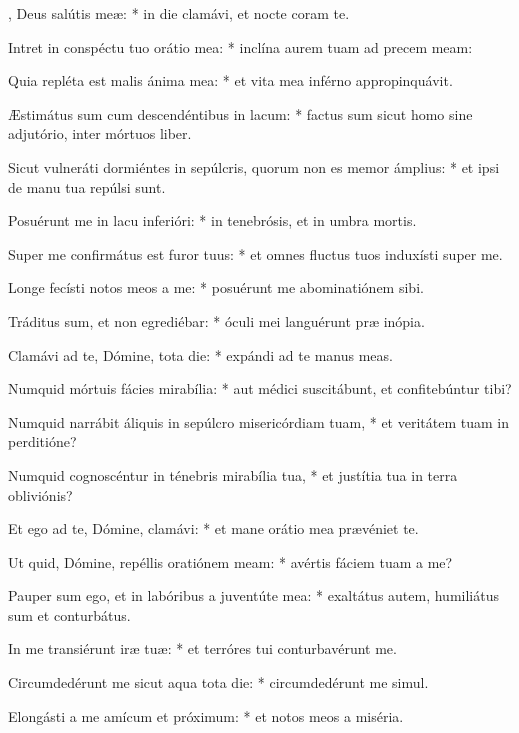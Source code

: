 \begin{psalmus}

, Deus salútis meæ: * in die clamávi, et nocte coram te.

Intret in conspéctu tuo orátio mea: * inclína aurem tuam ad precem meam:

Quia repléta est malis ánima mea: * et vita mea inférno appropinquávit.

Æstimátus sum cum descendéntibus in lacum: * factus sum sicut homo sine adjutório, inter mórtuos liber.

Sicut vulneráti dormiéntes in sepúlcris, quorum non es memor ámplius: * et ipsi de manu tua repúlsi sunt.

Posuérunt me in lacu inferióri: * in tenebrósis, et in umbra mortis.

Super me confirmátus est furor tuus: * et omnes fluctus tuos induxísti super me.

Longe fecísti notos meos a me: * posuérunt me abominatiónem sibi.

Tráditus sum, et non egrediébar: * óculi mei languérunt præ inópia.

Clamávi ad te, Dómine, tota die: * expándi ad te manus meas.

Numquid mórtuis fácies mirabília: * aut médici suscitábunt, et confitebúntur tibi?

Numquid narrábit áliquis in sepúlcro misericórdiam tuam, * et veritátem tuam in perditióne?

Numquid cognoscéntur in ténebris mirabília tua, * et justítia tua in terra obliviónis?

Et ego ad te, Dómine, clamávi: * et mane orátio mea prævéniet te.

Ut quid, Dómine, repéllis oratiónem meam: * avértis fáciem tuam a me?

Pauper sum ego, et in labóribus a juventúte mea: * exaltátus autem, humiliátus sum et conturbátus.

In me transiérunt iræ tuæ: * et terróres tui conturbavérunt me.

Circumdedérunt me sicut aqua tota die: * circumdedérunt me simul.

Elongásti a me amícum et próximum: * et notos meos a miséria.

\end{psalmus}
